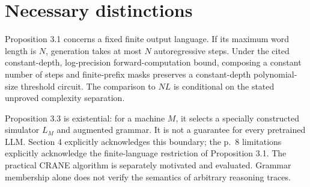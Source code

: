 \documentclass[10pt]{article}
\begin{document}
\section*{Necessary distinctions}
Proposition 3.1 concerns a fixed finite output language. If its maximum word length is \(N\), generation takes at most \(N\) autoregressive steps. Under the cited constant-depth, log-precision forward-computation bound, composing a constant number of steps and finite-prefix masks preserves a constant-depth polynomial-size threshold circuit. The comparison to \(NL\) is conditional on the stated unproved complexity separation.\par
Proposition 3.3 is existential: for a machine \(M\), it selects a specially constructed simulator \(L_M\) and augmented grammar. It is not a guarantee for every pretrained LLM. Section 4 explicitly acknowledges this boundary; the p. 8 limitations explicitly acknowledge the finite-language restriction of Proposition 3.1. The practical CRANE algorithm is separately motivated and evaluated. Grammar membership alone does not verify the semantics of arbitrary reasoning traces.\par
\end{document}
